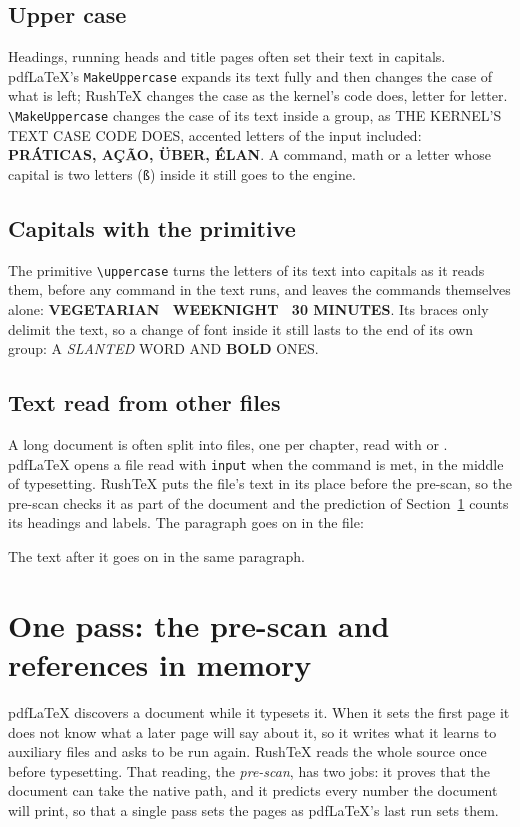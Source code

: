 \documentclass{article}
\numberwithin{equation}{section}
\newcommand{\rtpart}[2]{\section{#1}\label{#2}}
\theoremstyle{definition}
\theoremstyle{remark}
\begin{document}
\subsection{Upper case}\label{sec:uppercase}
Headings, running heads and title pages often set their text in capitals. pdfLaTeX's
\texttt{MakeUppercase} expands its text fully and then changes the case of what is left;
RushTeX changes the case as the kernel's code does, letter for letter.
\texttt{\textbackslash MakeUppercase} changes the case of its text inside a group, as
\MakeUppercase{the kernel's text case code does}, accented letters of the input
included: {\large\bfseries \MakeUppercase{práticas, ação, über, élan}}. A command, math or a
letter whose capital is two letters (\texttt{ß}) inside it still goes to the engine.

\subsection{Capitals with the primitive}\label{sec:upcase}
The primitive \verb|\uppercase| turns the letters of its text into capitals as it reads
them, before any command in the text runs, and leaves the commands themselves alone:
{\small\bfseries\uppercase{Vegetarian \textbullet\ Weeknight \textbullet\ 30 Minutes}}.
Its braces only delimit the text, so a change of font inside it still lasts to the end of
its own group: \uppercase{a {\itshape slanted} word and \textbf{bold} ones}.

\subsection{Text read from other files}\label{sec:input}
A long document is often split into files, one per chapter, read with \verb|| or
\verb||. pdfLaTeX opens a file read with \texttt{input} when the command is met,
in the middle of typesetting. RushTeX puts the file's text in its place before the
pre-scan, so the pre-scan checks it as part of the document and the prediction of
Section~\ref{sec:onepass} counts its headings and labels. The paragraph goes on in the
file:

The text after it goes on in the same paragraph.

\rtpart{One pass: the pre-scan and references in memory}{sec:onepass}

pdfLaTeX discovers a document while it typesets it. When it sets the first page it does
not know what a later page will say about it, so it writes what it learns to auxiliary
files and asks to be run again. RushTeX reads the whole source once before typesetting.
That reading, the \emph{pre-scan}, has two jobs: it proves that the document can take
the native path, and it predicts every number the document will print, so that a single
pass sets the pages as pdfLaTeX's last run sets them.
\end{document}
